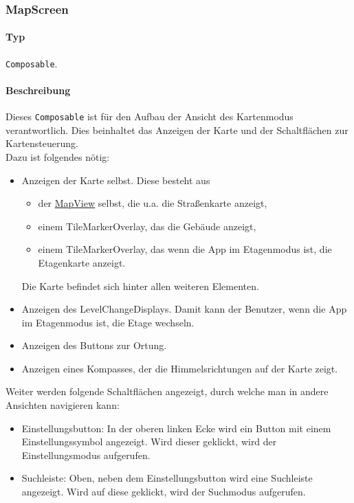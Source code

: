 \subsubsection{MapScreen}
\paragraph*{Typ}
\texttt{Composable}.
\paragraph*{Beschreibung}
Dieses \texttt{Composable} ist für den Aufbau der Ansicht des Kartenmodus verantwortlich.
Dies beinhaltet das Anzeigen der Karte und der Schaltflächen zur Kartensteuerung.\\
Dazu ist folgendes nötig:
\begin{itemize}
    \item Anzeigen der Karte selbst. Diese besteht aus
        \begin{itemize}
            \item der \href{https://osmdroid.github.io/osmdroid/javadocAll/org/osmdroid/views/MapView.html}
            {MapView} selbst, die u.a. die Straßenkarte anzeigt,
            \item einem TileMarkerOverlay, das die Gebäude anzeigt,
            \item einem TileMarkerOverlay, das wenn die App im Etagenmodus ist, die Etagenkarte anzeigt.
        \end{itemize}
        Die Karte befindet sich hinter allen weiteren Elementen.
    \item Anzeigen des LevelChangeDisplays. Damit kann der Benutzer, wenn die App im Etagenmodus 
    ist, die Etage wechseln.
    \item Anzeigen des Buttons zur Ortung.
    \item Anzeigen eines Kompasses, der die Himmelsrichtungen auf der Karte zeigt.
\end{itemize}
Weiter werden folgende Schaltflächen angezeigt, durch welche man in andere Ansichten navigieren kann:
\begin{itemize}
    \item Einstellungsbutton: In der oberen linken Ecke wird ein Button mit einem Einstellungssymbol angezeigt. 
    Wird dieser geklickt, wird der Einstellungsmodus aufgerufen.
    \item Suchleiste: Oben, neben dem Einstellungsbutton wird eine Suchleiste angezeigt. 
    Wird auf diese geklickt, wird der Suchmodus aufgerufen.
\end{itemize}

